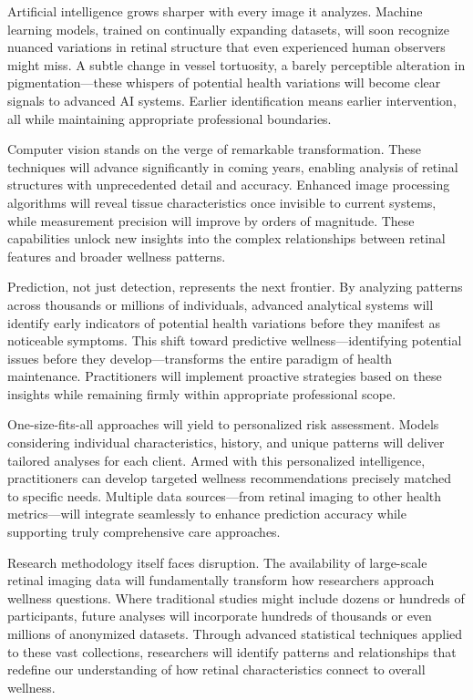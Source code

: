 \documentclass[
  Letterpaper,
]{scrbook}
\begin{document}
Artificial intelligence grows sharper with every image it analyzes.
Machine learning models, trained on continually expanding datasets, will
soon recognize nuanced variations in retinal structure that even
experienced human observers might miss. A subtle change in vessel
tortuosity, a barely perceptible alteration in pigmentation---these
whispers of potential health variations will become clear signals to
advanced AI systems. Earlier identification means earlier intervention,
all while maintaining appropriate professional boundaries.

Computer vision stands on the verge of remarkable transformation. These
techniques will advance significantly in coming years, enabling analysis
of retinal structures with unprecedented detail and accuracy. Enhanced
image processing algorithms will reveal tissue characteristics once
invisible to current systems, while measurement precision will improve
by orders of magnitude. These capabilities unlock new insights into the
complex relationships between retinal features and broader wellness
patterns.

Prediction, not just detection, represents the next frontier. By
analyzing patterns across thousands or millions of individuals, advanced
analytical systems will identify early indicators of potential health
variations before they manifest as noticeable symptoms. This shift
toward predictive wellness---identifying potential issues before they
develop---transforms the entire paradigm of health maintenance.
Practitioners will implement proactive strategies based on these
insights while remaining firmly within appropriate professional scope.

One-size-fits-all approaches will yield to personalized risk assessment.
Models considering individual characteristics, history, and unique
patterns will deliver tailored analyses for each client. Armed with this
personalized intelligence, practitioners can develop targeted wellness
recommendations precisely matched to specific needs. Multiple data
sources---from retinal imaging to other health metrics---will integrate
seamlessly to enhance prediction accuracy while supporting truly
comprehensive care approaches.

Research methodology itself faces disruption. The availability of
large-scale retinal imaging data will fundamentally transform how
researchers approach wellness questions. Where traditional studies might
include dozens or hundreds of participants, future analyses will
incorporate hundreds of thousands or even millions of anonymized
datasets. Through advanced statistical techniques applied to these vast
collections, researchers will identify patterns and relationships that
redefine our understanding of how retinal characteristics connect to
overall wellness.
\end{document}
